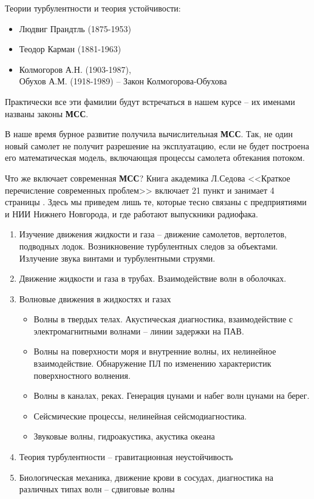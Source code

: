 Теории турбулентности и теория устойчивости:
\begin{itemize}
	\setlength\itemsep{-0.4em}
	\item Людвиг Прандтль  (1875-1953)
	\item Теодор Карман (1881-1963)
	\item Колмогоров А.Н.  (1903-1987), \\Обухов А.М.   (1918-1989) --  Закон Колмогорова-Обухова
\end{itemize}

Практически все эти фамилии будут встречаться в нашем курсе -- их именами названы законы \textbf{МСС}.

В наше время бурное развитие получила вычислительная \textbf{МСС}. Так, не один новый самолет не получит разрешение на эксплуатацию, если не будет построена его математическая модель, включающая процессы самолета  обтекания потоком.

Что же включает современная \textbf{МСС}? Книга академика Л.Седова <<Краткое перечисление современных проблем>> включает 21 пункт и занимает 4 страницы \cite{nu10}. Здесь мы приведем лишь те, которые тесно связаны с предприятиями и НИИ Нижнего Новгорода, и где работают выпускники радиофака.

\begin{enumerate}
	\item Изучение движения жидкости и газа -- движение самолетов, вертолетов, подводных лодок.  Возникновение турбулентных следов за объектами. Излучение звука винтами и турбулентными струями. 
	\item Движение жидкости и газа в трубах. Взаимодействие волн в оболочках. 
	\item Волновые движения в жидкостях и газах
	\begin{itemize}
		\item Волны в твердых телах.  Акустическая диагностика, взаимодействие с электромагнитными волнами -- линии задержки на ПАВ.
		\item Волны на поверхности моря и внутренние волны, их нелинейное взаимодействие. Обнаружение ПЛ по изменению характеристик поверхностного волнения.
		\item Волны в каналах, реках. Генерация цунами и  набег волн цунами на берег.
		\item Сейсмические процессы, нелинейная сейсмодиагностика.
		\item Звуковые волны,  гидроакустика, акустика океана
	\end{itemize}
	\item Теория турбулентности -- гравитационная неустойчивость
	\item Биологическая механика, движение крови в сосудах, диагностика на различных типах волн -- сдвиговые волны
\end{enumerate}


